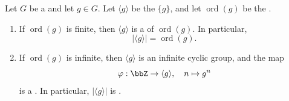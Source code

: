 \begin{proposition} \label{proposition:order_of_cyclic_subgroup_generated_by_element_equals_order_of_element}
    Let $G$ be a  and let $g \in G$. Let $\langle g \rangle$ be the  $\{g\}$, and let $\operatorname{ord}(g)$ be the .

    \begin{enumerate}
        \item If $\operatorname{ord}(g)$ is finite, then $\langle g \rangle$ is a  of  $\operatorname{ord}(g)$. In particular,
        $$|\langle g \rangle| = \operatorname{ord}(g).$$

        \item If $\operatorname{ord}(g)$ is infinite, then $\langle g \rangle$ is an infinite cyclic group, and the map
        $$\varphi : \bbZ \to \langle g \rangle, \quad n \mapsto g^n$$
        is a . In particular, $|\langle g \rangle|$ is .
    \end{enumerate}
\end{proposition}
